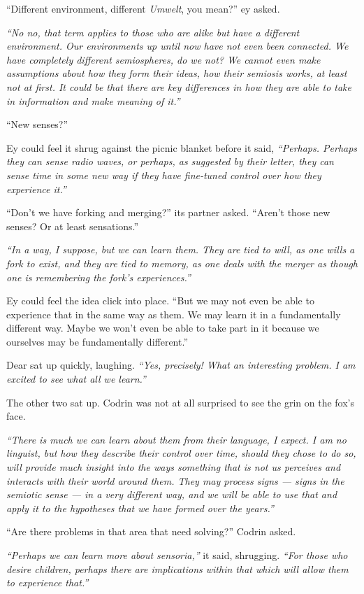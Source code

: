 ``Different environment, different \emph{Umwelt}, you mean?'' ey asked.

\emph{``No no, that term applies to those who are alike but have a different environment. Our environments up until now have not even been connected. We have completely different semiospheres, do we not? We cannot even make assumptions about how they form their ideas, how their semiosis works, at least not at first. It could be that there are key differences in how they are able to take in information and make meaning of it.''}

``New senses?''

Ey could feel it shrug against the picnic blanket before it said, \emph{``Perhaps. Perhaps they can sense radio waves, or perhaps, as suggested by their letter, they can sense time in some new way if they have fine-tuned control over how they experience it.''}

``Don't we have forking and merging?'' its partner asked. ``Aren't those new senses? Or at least sensations.''

\emph{``In a way, I suppose, but we can learn them. They are tied to will, as one wills a fork to exist, and they are tied to memory, as one deals with the merger as though one is remembering the fork's experiences.''}

Ey could feel the idea click into place. ``But we may not even be able to experience that in the same way as them. We may learn it in a fundamentally different way. Maybe we won't even be able to take part in it because we ourselves may be fundamentally different.''

Dear sat up quickly, laughing. \emph{``Yes, precisely! What an interesting problem. I am excited to see what all we learn.''}

The other two sat up. Codrin was not at all surprised to see the grin on the fox's face.

\emph{``There is much we can learn about them from their language, I expect. I am no linguist, but how they describe their control over time, should they chose to do so, will provide much insight into the ways something that is not us perceives and interacts with their world around them. They may process signs — signs in the semiotic sense — in a very different way, and we will be able to use that and apply it to the hypotheses that we have formed over the years.''}

``Are there problems in that area that need solving?'' Codrin asked.

\emph{``Perhaps we can learn more about sensoria,''} it said, shrugging. \emph{``For those who desire children, perhaps there are implications within that which will allow them to experience that.''}

